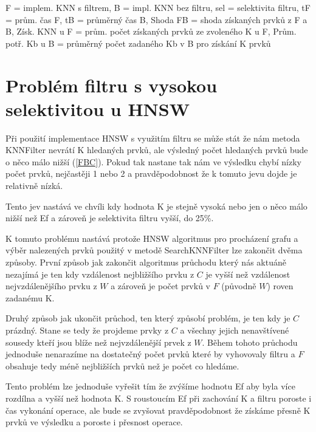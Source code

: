 \documentclass[czech,semestral,dept460,male,csharp,cpdeclaration]{diploma}
\begin{document}
\begin{center}
			{\footnotesize *F = implem. KNN s filtrem, B = impl. KNN bez filtru, sel = selektivita filtru, tF = prům. čas F, tB = průměrný čas B, Shoda FB = shoda získaných prvků z F a B, Získ. KNN u F = prům. počet získaných prvků ze zvoleného K u F, Prům. potř. Kb u B = průměrný počet zadaného Kb v B pro získání K prvků}\\
			
		
		\end{center}
		
		\section{Problém filtru s vysokou selektivitou u HNSW}
		\label{FP}
		
			Při použití implementace HNSW s využitím filtru se může stát že nám metoda KNNFilter nevrátí K hledaných prvků, ale výsledný počet hledaných prvků bude o něco málo nižší (\ref{FBC}). Pokud tak nastane tak nám ve výsledku chybí nízky počet prvků, nejčastěji 1 nebo 2 a pravděpodobnost že k tomuto jevu dojde je relativně nízká.
			
			Tento jev nastává ve chvíli kdy hodnota K je stejně vysoká nebo jen o něco málo nižší než Ef a zároveň je selektivita filtru vyšší, do 25\%.
			
			K tomuto problému nastává protože HNSW algoritmus pro procházení grafu a výběr nalezených prvků použitý v metodě SearchKNNFilter lze zakončit dvěma způsoby. První způsob jak zakončit algoritmus průchodu který nás aktuáně nezajímá je ten kdy vzdálenost nejbližšího prvku z $C$ je vyšší než vzdálenost nejvzdálenějšího prvku z $W$ a zároveň je počet prvků v $F$ (původně $W$) roven zadanému K.
			
			Druhý způsob jak ukončit průchod, ten který způsobí problém, je ten kdy je $C$ prázdný. Stane se tedy že projdeme prvky z $C$ a všechny jejich nenavštívené sousedy kteří jsou blíže než nejvzdálenější prvek z $W$. Během tohoto průchodu jednoduše nenarazíme na dostatečný počet prvků které by vyhovovaly filtru a $F$ obsahuje tedy méně nejbližších prvků než je počet co hledáme.
			
			Tento problém lze jednoduše vyřešit tím že zvýšíme hodnotu Ef aby byla více rozdílna a vyšší než hodnota K. S roustoucím Ef při zachování K a filtru poroste i čas vykonání operace, ale bude se zvyšovat pravděpodobnost že získáme přesně K prvků ve výsledku a poroste i přesnost operace.
	
\end{document}
